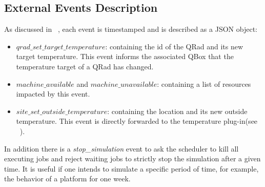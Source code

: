 \subsection{External Events Description}
As discussed in ~, each event is timestamped and is described as a JSON object:
\begin{itemize}
    \item $qrad\_set\_target\_temperature$: containing the id of the QRad and its new target temperature. This event informs the associated QBox that the temperature target of a QRad has changed.
    \item $machine\_available$ and $machine\_unavailable$: containing a list of resources impacted by this event.
    \item $site\_set\_outside\_temperature$: containing the location and its new outside temperature. This event is directly forwarded to the temperature plug-in(see ~).
\end{itemize}


In addition there is a \emph{stop\_simulation} event to ask the scheduler to kill all executing jobs and reject waiting jobs to strictly stop the simulation after a given time. It is useful if one intends to simulate a specific period of time, for example, the behavior of a platform for one week.


